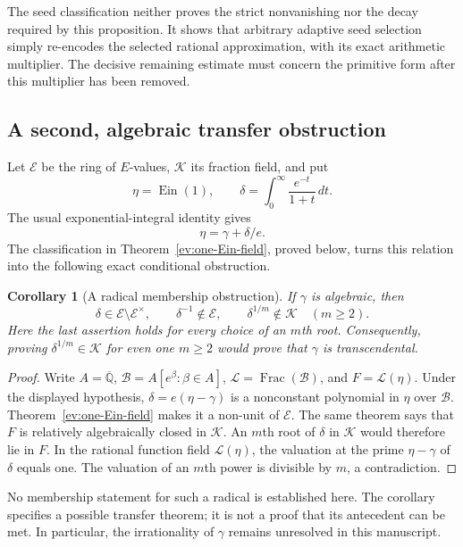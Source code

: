 \documentclass[11pt,a4paper]{article}
\numberwithin{equation}{section}
\newtheorem{corollary}[theorem]{Corollary}
\theoremstyle{definition}
\theoremstyle{remark}
\begin{document}
The seed classification neither proves the strict nonvanishing nor
the decay required by this proposition. It shows that arbitrary
adaptive seed selection simply re-encodes the selected rational
approximation, with its exact arithmetic multiplier. The decisive
remaining estimate must concern the primitive form after this
multiplier has been removed.

\subsection{A second, algebraic transfer obstruction}

Let $\mathcal E$ be the ring of $E$-values, $\mathcal K$ its fraction
field, and put
\[
 \eta=\operatorname{Ein}(1),\qquad
 \delta=\int_0^\infty\frac{e^{-t}}{1+t}\,dt.
\]
The usual exponential-integral identity \cite[Section 6.2]{NISTDLMF}
gives
\begin{equation}\label{ext:gamma-ein}
 \eta=\gamma+\delta/e.
\end{equation}
The classification in Theorem~\ref{ev:one-Ein-field}, proved below,
turns this relation into the following exact conditional obstruction.

\begin{corollary}[A radical membership obstruction]
\label{ext:gamma-radical}
If $\gamma$ is algebraic, then
\[
 \delta\in\mathcal E\setminus\mathcal E^\times,
 \qquad \delta^{-1}\notin\mathcal E,
 \qquad \delta^{1/m}\notin\mathcal K\quad(m\ge2).
\]
Here the last assertion holds for every choice of an $m$th root.
Consequently, proving $\delta^{1/m}\in\mathcal K$ for even one
$m\ge2$ would prove that $\gamma$ is transcendental.
\end{corollary}
\begin{proof}
Write $A=\overline{\mathbb Q}$, $\mathcal B=A[e^\beta:\beta\in A]$,
$\mathcal L=\operatorname{Frac}(\mathcal B)$, and
$F=\mathcal L(\eta)$. Under the displayed hypothesis,
$\delta=e(\eta-\gamma)$ is a nonconstant polynomial in $\eta$
over $\mathcal B$. Theorem~\ref{ev:one-Ein-field} makes it a
non-unit of $\mathcal E$. The same theorem says that $F$ is
relatively algebraically closed in $\mathcal K$. An $m$th root
of $\delta$ in $\mathcal K$ would therefore lie in $F$.
In the rational function field $\mathcal L(\eta)$, the valuation
at the prime $\eta-\gamma$ of $\delta$ equals one. The valuation
of an $m$th power is divisible by $m$, a contradiction.
\end{proof}

No membership statement for such a radical is established here.
The corollary specifies a possible transfer theorem; it is not a
proof that its antecedent can be met. In particular, the irrationality
of $\gamma$ remains unresolved in this manuscript.
\end{document}
